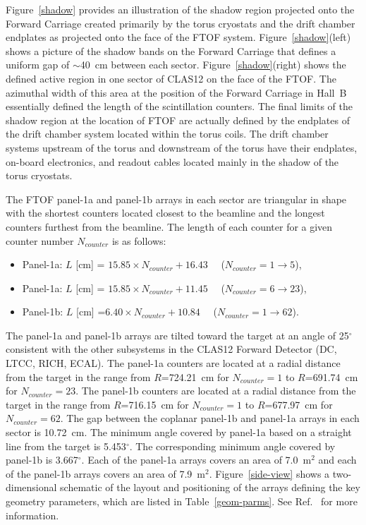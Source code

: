 \documentclass{elsart}
\begin{document}
Figure~\ref{shadow} provides an illustration of the shadow region projected onto the Forward Carriage
created primarily by the torus cryostats and the drift chamber endplates as projected onto the face of
the FTOF system. Figure~\ref{shadow}(left) shows a picture of the shadow bands on the Forward
Carriage that defines a uniform gap of $\sim$40~cm between each sector. Figure~\ref{shadow}(right)
shows the defined active region in one sector of CLAS12 on the face of the FTOF. The azimuthal width
of this area at the position of the Forward Carriage in Hall~B essentially defined the length of the
scintillation counters. The final limits of the shadow region at the location of FTOF are actually defined
by the endplates of the drift chamber system located within the torus coils. The drift chamber systems
upstream of the torus and downstream of the torus have their endplates, on-board electronics, and readout
cables located mainly in the shadow of the torus cryostats.

The FTOF panel-1a and panel-1b arrays in each sector are triangular in shape with the shortest counters
located closest to the beamline and the longest counters furthest from the beamline. The length of each
counter for a given counter number $N_{counter}$ is as follows:

\begin{itemize}
\item Panel-1a: $L$ [cm] = $15.85 \times N_{counter} + 16.43$ ~~($N_{counter} = 1 \to 5$), 
\item Panel-1a: $L$ [cm] = $15.85 \times N_{counter} + 11.45$ ~~($N_{counter} = 6 \to 23$), 
\item Panel-1b: $L$ [cm] =$ 6.40 \times N_{counter} + 10.84$ ~~($N_{counter} = 1 \to 62$).
\end{itemize}

The panel-1a and panel-1b arrays are tilted toward the target at an angle of 25$^{\circ}$ consistent with
the other subsystems in the CLAS12 Forward Detector (DC, LTCC, RICH, ECAL). The panel-1a counters
are located at a radial distance from the target in the range from $R$=724.21~cm for $N_{counter} = 1$ to
$R$=691.74~cm for $N_{counter} =23$. The panel-1b counters are located at a radial distance from the
target in the range from $R$=716.15~cm for $N_{counter} = 1$ to $R$=677.97~cm for $N_{counter}=62$.
The gap between the coplanar panel-1b and panel-1a arrays in each sector is 10.72~cm. The minimum angle
covered by panel-1a based on a straight line from the target is 5.453$^\circ$. The corresponding minimum
angle covered by panel-1b is 3.667$^\circ$. Each of the panel-1a arrays covers an area of 7.0~m$^2$ and
each of the panel-1b arrays covers an area of 7.9~m$^2$. Figure~\ref{side-view} shows a two-dimensional
schematic of the layout and positioning of the arrays defining the key geometry parameters, which are
listed in Table~\ref{geom-parms}. See Ref.~\cite{ftof-geom} for more information.
\end{document}
